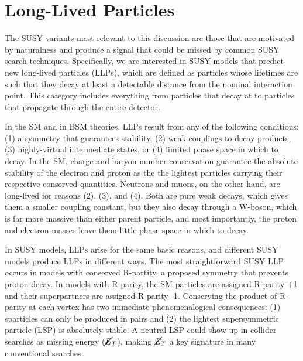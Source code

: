 \documentclass[12pt]{article}
\begin{document}
\section{Long-Lived Particles}
    The SUSY variants most relevant to this discussion are those that are motivated by naturalness and  produce a signal that could be missed by common SUSY search techniques. Specifically, we are interested in SUSY models that predict new long-lived particles (LLPs), which are defined as particles whose lifetimes are such that they decay at least a detectable distance from the nominal interaction point. This category includes everything from particles that decay at  to particles that propagate through the entire detector. 

    In the SM and in BSM theories, LLPs result from any of the following conditions: (1) a symmetry that guarantees stability, (2) weak couplings to decay products, (3) highly-virtual intermediate states, or (4) limited phase space in which to decay. In the SM, charge and baryon number conservation guarantee the absolute stability of the electron and proton as the the lightest particles carrying their respective conserved quantities. Neutrons and muons, on the other hand, are long-lived for reasons (2), (3), and (4). Both are pure weak decays, which gives them a smaller coupling constant, but they also decay through a W-boson, which is far more massive than either parent particle, and most importantly, the proton and electron masses leave them little phase space in which to decay.   

    In SUSY models, LLPs arise for the same basic reasons, and different SUSY models produce LLPs in different ways. The most straightforward SUSY LLP occurs in models with conserved R-partity, a proposed symmetry that prevents proton decay. In models with R-parity, the SM particles are assigned R-parity +1 and their superpartners are assigned R-parity -1. Conserving the product of R-parity at each vertex has two immediate phenomenalogical consequences: (1) sparticles can only be produced in pairs and (2) the lightest supersymmetric particle (LSP) is absolutely stable. A neutral LSP could show up in collider searches as missing energy ($\cancel{\it{E}}_{T}$), making $\cancel{\it{E}}_{T}$ a key signature in many conventional searches.
\end{document}
